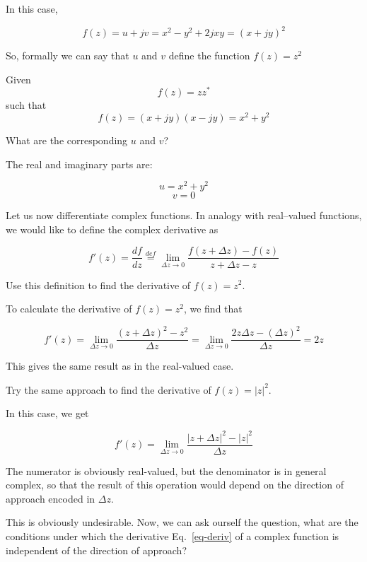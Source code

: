 In this case,

$$f(z) = u + j v = x^2 - y^2 +2j x y = (x + jy)^2$$

So, formally we can say that $u$ and $v$ define the function $f(z) = z^2$

\begin{cue}
Given
$$f(z) = z z^* $$
such that
$$f(z) = (x + jy)(x - jy) = x^2 + y^2$$

What are the corresponding $u$ and $v$?
\end{cue}

The real and imaginary parts are:

$$u = x^2 + y^2$$
$$v = 0$$


Let us now differentiate complex functions. In analogy with real--valued functions, we would like to define the complex derivative as

\begin{equation}
f' (z)=\frac{df}{dz} \stackrel{def}{=} \lim_{\Delta z \to 0} \frac{f(z+\Delta z) - f(z)}{z+\Delta z - z} \label{eq-deriv}
\end{equation} 

\begin{cue}
Use this definition to find the derivative of $f(z)=z^2$.
\end{cue}

To calculate the derivative of  $f(z)=z^2$, we find that

$$f'(z)=\lim_{\Delta z \to 0} \frac{(z+\Delta z)^2 - z^2}{\Delta z} = \lim_{\Delta z \to 0} \frac{2 z \Delta z - (\Delta z)^2}{\Delta z}=2z $$

This gives the same result as in the real-valued case.

\begin{cue}
Try the same approach to find the derivative of $f(z)=|z|^2$.
\end{cue}

In this case, we get

$$f'(z)=\lim_{\Delta z \to 0} \frac{|z+\Delta z|^2 - |z|^2}{\Delta z} $$

The numerator is obviously real-valued, but the denominator is in general complex, so that the result of this operation would depend on the direction of approach encoded in $\Delta z$.

This is obviously undesirable. Now, we can ask ourself the question, what are the conditions under which the derivative Eq.~\ref{eq-deriv} of a complex function is independent of the direction of approach?

